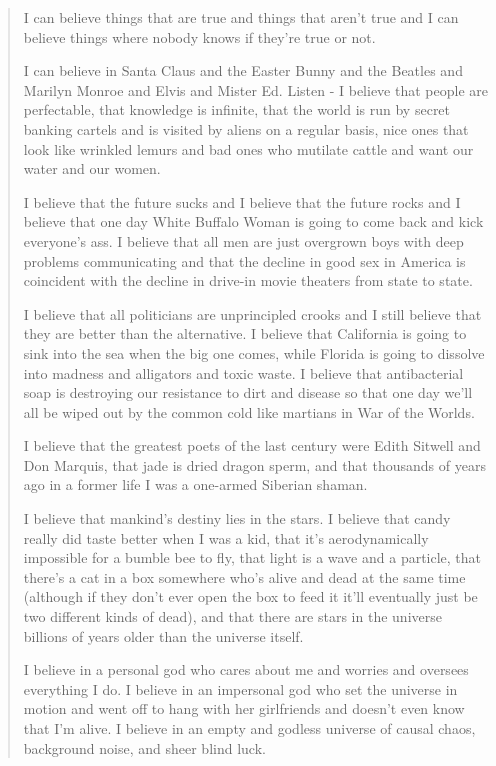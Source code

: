 \begin{quote}
    I can believe things that are true and things that aren't true and I can believe things where nobody knows if they're true or not. 

    I can believe in Santa Claus and the Easter Bunny and the Beatles and Marilyn Monroe and Elvis and Mister Ed. Listen - I believe that people are perfectable, that knowledge is infinite, that the world is run by secret banking cartels and is visited by aliens on a regular basis, nice ones that look like wrinkled lemurs and bad ones who mutilate cattle and want our water and our women. 

    I believe that the future sucks and I believe that the future rocks and I believe that one day White Buffalo Woman is going to come back and kick everyone's ass. I believe that all men are just overgrown boys with deep problems communicating and that the decline in good sex in America is coincident with the decline in drive-in movie theaters from state to state. 

    I believe that all politicians are unprincipled crooks and I still believe that they are better than the alternative. I believe that California is going to sink into the sea when the big one comes, while Florida is going to dissolve into madness and alligators and toxic waste. 
    I believe that antibacterial soap is destroying our resistance to dirt and disease so that one day we'll all be wiped out by the common cold like martians in War of the Worlds. 

    I believe that the greatest poets of the last century were Edith Sitwell and Don Marquis, that jade is dried dragon sperm, and that thousands of years ago in a former life I was a one-armed Siberian shaman. 

    I believe that mankind's destiny lies in the stars. I believe that candy really did taste better when I was a kid, that it's aerodynamically impossible for a bumble bee to fly, that light is a wave and a particle, that there's a cat in a box somewhere who's alive and dead at the same time (although if they don't ever open the box to feed it it'll eventually just be two different kinds of dead), and that there are stars in the universe billions of years older than the universe itself. 

    I believe in a personal god who cares about me and worries and oversees everything I do. I believe in an impersonal god who set the universe in motion and went off to hang with her girlfriends and doesn't even know that I'm alive. I believe in an empty and godless universe of causal chaos, background noise, and sheer blind luck. 


\end{quote}
